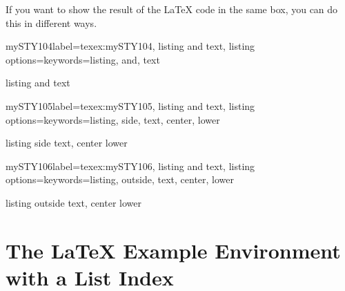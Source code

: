 \documentclass[]{myHOWTO-V001}
\begin{document}
If you want to show the result of the \LaTeX{} code in the same box, you can do this in different ways.

\begin{myTEXEXdoclst}{mySTY104}{label={texex:mySTY104}, listing and text, listing options={keywords={listing, and, text}}}
\begin{myTEXEX}{listing and text}
\lipsum[4]
\end{myTEXEX}
\end{myTEXEXdoclst}

\begin{myTEXEXdoclst}{mySTY105}{label={texex:mySTY105}, listing and text, listing options={keywords={listing, side, text, center, lower}}}
\begin{myTEXEX}{listing side text, center lower}
\end{myTEXEX}
\end{myTEXEXdoclst}

\begin{myTEXEXdoclst}{mySTY106}{label={texex:mySTY106}, listing and text, listing options={keywords={listing, outside, text, center, lower}}}
\begin{myTEXEX}{listing outside text, center lower}
\end{myTEXEX}
\end{myTEXEXdoclst}

%
%

\section{The \LaTeX{} Example Environment with a List Index}
\end{document}
